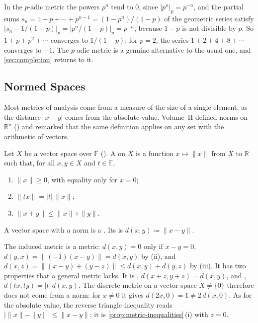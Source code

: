 In the $p$-adic metric the powers $p^n$ tend to $0$, since $|p^n|_p=p^{-n}$, and the partial sums $s_n=1+p+\cdots+p^{n-1}=(1-p^n)/(1-p)$ of the geometric series satisfy $|s_n-1/(1-p)|_p=|p^n/(1-p)|_p=p^{-n}$, because $1-p$ is not divisible by $p$. So $1+p+p^2+\cdots$ converges to $1/(1-p)$; for $p=2$, the series $1+2+4+8+\cdots$ converges to $-1$. The $p$-adic metric is a genuine alternative to the usual one, and \cref{sec:completion} returns to it.

\subsection{Normed Spaces}

Most metrics of analysis come from a measure of the size of a single element, as the distance $|x-y|$ comes from the absolute value. Volume~II defined norms on $\mathbb R^n$ () and remarked that the same definition applies on any set with the arithmetic of vectors.

\begin{definition}
\label{def:normed-space}
Let $X$ be a vector space over $\mathbb F$ (). A  on $X$ is a function $x\mapsto\|x\|$ from $X$ to $\mathbb R$ such that, for all $x,y\in X$ and $t\in\mathbb F$,
\begin{enumerate}
\item $\|x\|\ge0$, with equality only for $x=0$;
\item $\|tx\|=|t|\,\|x\|$;
\item $\|x+y\|\le\|x\|+\|y\|$.
\end{enumerate}
A vector space with a norm is a . Its  is $d(x,y)\coloneqq\|x-y\|$.
\end{definition}

The induced metric is a metric: $d(x,y)=0$ only if $x-y=0$, $d(y,x)=\|(-1)(x-y)\|=d(x,y)$ by (ii), and $d(x,z)=\|(x-y)+(y-z)\|\le d(x,y)+d(y,z)$ by (iii). It has two properties that a general metric lacks. It is , $d(x+z,y+z)=d(x,y)$, and , $d(tx,ty)=|t|\,d(x,y)$. The discrete metric on a vector space $X\ne\{0\}$ therefore does not come from a norm: for $x\ne0$ it gives $d(2x,0)=1\ne2\,d(x,0)$. As for the absolute value, the reverse triangle inequality reads $\bigl|\|x\|-\|y\|\bigr|\le\|x-y\|$; it is \cref{prop:metric-inequalities}\,(i) with $z=0$.

